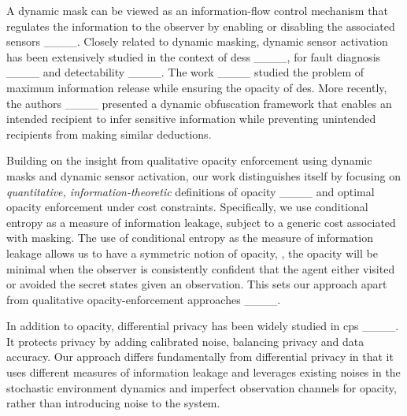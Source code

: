 A dynamic mask can be viewed as an information-flow control mechanism that  regulates the information to the observer by   enabling or disabling the associated sensors ____. Closely related to dynamic masking,  dynamic sensor activation has been extensively studied in the context of \ac{des}s ____, for  fault diagnosis ____ and detectability ____. %
The work ____ studied the problem of maximum information release while ensuring the opacity of \ac{des}. More recently, the authors ____ presented a dynamic obfuscation framework that enables an intended recipient to infer sensitive information while preventing unintended recipients from making similar deductions.  

Building on the insight from qualitative opacity enforcement using dynamic masks and dynamic sensor activation, our work distinguishes itself by focusing on \emph{quantitative, information-theoretic} definitions of opacity ____ and optimal opacity enforcement under cost constraints. Specifically, we use conditional entropy as a measure of information leakage, subject to a generic cost associated with masking. The use of conditional entropy as the measure of information leakage allows us to have a symmetric notion of opacity, \ie, the opacity will be minimal when the observer is consistently confident that the agent either visited or avoided the secret states given an observation. 
This sets our approach apart from qualitative opacity-enforcement approaches ____. %

In addition to  opacity,  differential privacy has been widely studied in \ac{cps} ____. It protects privacy by adding calibrated noise, balancing privacy and data accuracy. %
Our approach differs fundamentally from differential privacy in that it uses different measures of information leakage and leverages existing   noises in the stochastic environment dynamics and imperfect observation channels for opacity, rather than introducing noise to the system. 




